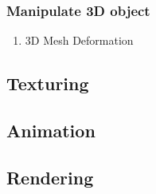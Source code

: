 \subsubsection{Manipulate 3D object}
\begin{enumerate}
    \item 3D Mesh Deformation
\end{enumerate}

\subsection{Texturing}

\subsection{Animation}

\subsection{Rendering}